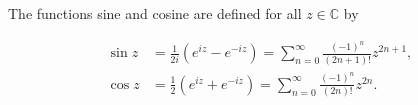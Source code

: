 The functions sine and cosine are defined for all $z \in \mathbb{C}$ by

\begin{align}
\sin z &= \frac{1}{2i} (e^{iz} - e^{-iz}) = \sum_{n=0}^{\infty} \frac{(-1)^n}{(2n+1)!} z^{2n+1}, \\
\cos z &= \frac{1}{2} (e^{iz} + e^{-iz}) = \sum_{n=0}^{\infty} \frac{(-1)^n}{(2n)!} z^{2n}.
\end{align}
